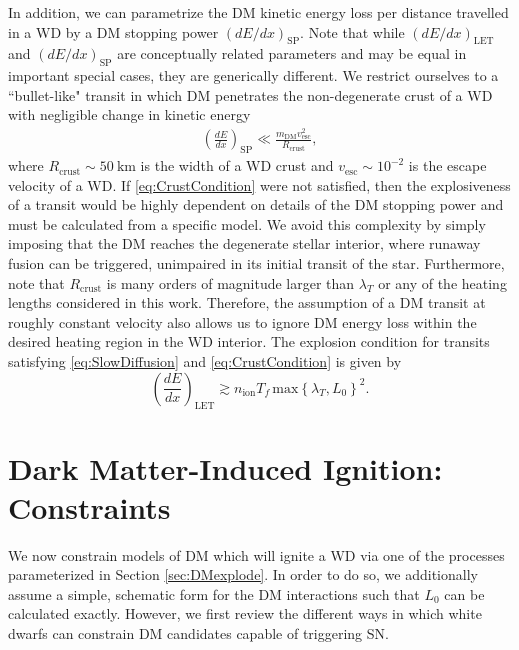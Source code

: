 \documentclass[twocolumn,showpacs,preprintnumbers,amsmath,amssymb,prd]{revtex4}
\begin{document}
In addition, we can parametrize the DM kinetic energy loss per distance travelled in a WD by a DM stopping power $(dE/dx)_\text{SP}$. 
Note that while $(dE/dx)_\text{LET}$ and $(dE/dx)_\text{SP}$ are conceptually related parameters and may be equal in important special cases, they are generically different.
We restrict ourselves to a ``bullet-like" transit in which DM penetrates the non-degenerate crust of a WD with negligible change in kinetic energy
\begin{align}
\label{eq:CrustCondition}
  \left( \frac{d E}{d x} \right)_\text{SP} \ll 
  \frac{m_\text{DM} v^2_\text{esc}}{R_\text{crust}},
\end{align}
where $R_\text{crust} \sim 50 ~\text{km}$ is the width of a WD crust and $v_\text{esc} \sim 10^{-2}$ is the escape velocity of a WD. 
If \eqref{eq:CrustCondition} were not satisfied, then the explosiveness of a transit would be highly dependent on details of the DM stopping power and must be calculated from a specific model.
We avoid this complexity by simply imposing that the DM reaches the degenerate stellar interior, where runaway fusion can be triggered, unimpaired in its initial transit of the star. 
Furthermore, note that $R_\text{crust}$ is many orders of magnitude larger than $\lambda_T$ or any of the heating lengths considered in this work. 
Therefore, the assumption of a DM transit at roughly constant velocity also allows us to ignore DM energy loss within the desired heating region in the WD interior. 
The explosion condition for transits satisfying \eqref{eq:SlowDiffusion} and \eqref{eq:CrustCondition} is given by
\begin{equation}
\label{eq:transitexplosion}
  \left( \frac{d E}{d x} \right)_\text{LET} \gtrsim n_\text{ion} T_f\, \text{max}\left\{\lambda_T, L_0 \right\}^2.
\end{equation}

\section{Dark Matter-Induced Ignition: Constraints}
\label{sec:Constraints}

We now constrain models of DM which will ignite a WD via one of the processes parameterized in Section \ref{sec:DMexplode}.
In order to do so, we additionally assume a simple, schematic form for the DM interactions such that $L_0$ can be calculated exactly. 
However, we first review the different ways in which white dwarfs can constrain DM candidates capable of triggering SN. 
\end{document}
